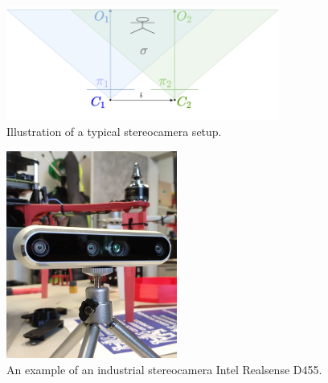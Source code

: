 \begin{figure}[ht]
    \centering
    \includegraphics[width=0.8\textwidth]{graphics/stereopair.png}
    \caption{Illustration of a typical stereocamera setup.}
    \label{fig:sch_stereo}
\end{figure}
\begin{figure}[ht]
    \centering
    \includegraphics[width=0.5\textwidth]{graphics/stereo_example.jpg}
    \caption{An example of an industrial stereocamera Intel Realsense D455.}
    \label{fig:stereo_ex}
\end{figure}


